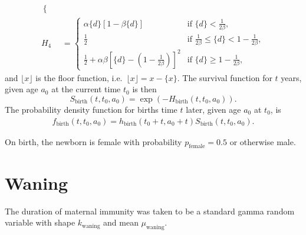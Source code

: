 \documentclass[12pt]{article}
\newcommand{\md}{\mathrm{d}}
\begin{document}
\begin{equation}
\begin{split}
\begin{cases}
    \end{cases}
    \\
    H_4 &=
    \begin{cases}
      \alpha \{d\} \left[1 - \beta \{d\}\right]
      & \text{if $\{d\} < \frac{1}{2 \beta}$},
      \\
      \frac{1}{2}
      & \text{if $\frac{1}{2 \beta} \leq \{d\} <
        1 - \frac{1}{2 \beta}$},
      \\
      \frac{1}{2}
      + \alpha \beta
      \left[\{d\} - \left(1 - \frac{1}{2 \beta}\right)\right]^2
      & \text{if $\{d\} \geq 1 - \frac{1}{2 \beta}$},
    \end{cases}
  \end{split}
\end{equation}
and $\lfloor x \rfloor$ is the floor function,
i.e.~$\lfloor x \rfloor = x - \{x\}$.
The survival function for $t$ years, given age
$a_0$ at the current time $t_0$ is then
\begin{equation}
  S_{\text{birth}}(t, t_0, a_0) = \exp\left(- H_{\text{birth}}(t, t_0, a_0)\right).
\end{equation}
The probability density function for births time $t$ later, given age
$a_0$ at $t_0$, is
\begin{align}
  f_{\text{birth}}(t, t_0, a_0) =
  h_{\text{birth}}(t_0 + t, a_0 + t)
  S_{\text{birth}}(t, t_0, a_0).
\end{align}


On birth, the newborn is female with probability
$p_{\text{female}} = 0.5$ or otherwise male.


\section{Waning}

The duration of maternal immunity was taken to be a standard gamma
random variable with shape $k_{\text{waning}}$
and mean $\mu_{\text{waning}}$.
\end{document}
